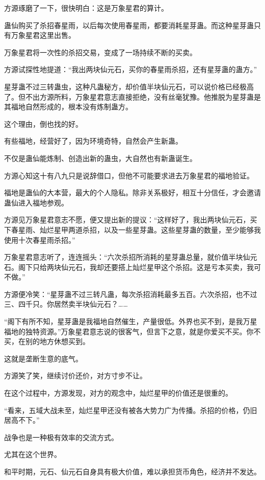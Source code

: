 \begin{this_body}
方源琢磨了一下，很快明白：这是万象星君的算计。

蛊仙购买了杀招春星雨，以后每次使用春星雨，都要消耗星芽蛊。而这种星芽蛊只有万象星君这里出售。

万象星君将一次性的杀招交易，变成了一场持续不断的买卖。

方源试探性地提道：“我出两块仙元石，买你的春星雨杀招，还有星芽蛊的蛊方。”

星芽蛊不过三转蛊虫，这种凡蛊秘方，却价值半块仙元石，可以说价格已经极高了。但不出方源所料，万象星君意志直接拒绝，没有丝毫犹豫。他推脱为星芽蛊是其福地自然形成的，根本没有炼制蛊方。

这个理由，倒也找的好。

有些福地，经营好了，因为环境奇特，自然会产生新蛊。

不仅是蛊仙能炼制、创造出新的蛊虫，大自然也有新蛊诞生。

方源心知这十有八九只是说辞借口，但他不可能要求进去万象星君的福地验证。

福地是蛊仙的大本营，最大的个人隐私。除非关系极好，相互十分信任，才会邀请蛊仙进入福地参观。

方源见万象星君意志不愿，便又提出新的提议：“这样好了，我出两块仙元石，买下春星雨、灿烂星甲两道杀招，以及一些星芽蛊。这些星芽蛊的数量，至少能够我使用十次春星雨杀招。”

万象星君意志听了，连连摇头：“六次杀招所消耗的星芽蛊总量，就价值半块仙元石。阁下只给两块仙元石，我却还要搭上灿烂星甲这个杀招。这是亏本买卖，我可不做。”

方源便冷笑：“星芽蛊不过三转凡蛊，每次杀招消耗最多五百。六次杀招，也不过三、四千只。你居然卖半块仙元石？……

“阁下有所不知，星芽蛊是我福地自然催生，产量很低。外界也买不到，是我万星福地的独特资源。”万象星君意志说的很客气，但言下之意，就是你爱买不买。你不买，在别的地方休想买到。

这就是垄断生意的底气。

方源笑了笑，继续讨价还价，对方寸步不让。

在这个过程中，方源发现，对方的观念中，灿烂星甲的价值还是很重的。

“看来，五域大战未至，灿烂星甲还没有被各大势力广为传播。杀招的价格，仍旧居高不下。”

战争也是一种极有效率的交流方式。

尤其在这个世界。

和平时期，元石、仙元石自身具有极大价值，难以承担货币角色，经济并不发达。


\end{this_body}
